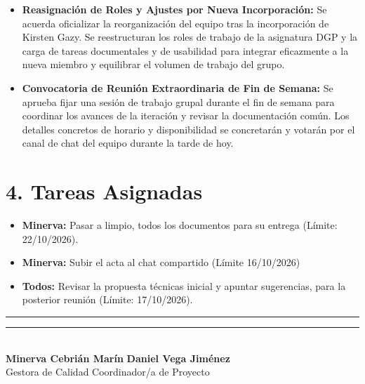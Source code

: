 \begin{itemize}
    \item \textbf{Reasignación de Roles y Ajustes por Nueva Incorporación:} 
    Se acuerda oficializar la reorganización del equipo tras la incorporación de Kirsten Gazy. Se reestructuran los roles de trabajo de la asignatura DGP y la carga de tareas documentales y de usabilidad para integrar eficazmente a la nueva miembro y equilibrar el volumen de trabajo del grupo.
    \item \textbf{Convocatoria de Reunión Extraordinaria de Fin de Semana:} 
    Se aprueba fijar una sesión de trabajo grupal durante el fin de semana para coordinar los avances de la iteración y revisar la documentación común. Los detalles concretos de horario y disponibilidad se concretarán y votarán por el canal de chat del equipo durante la tarde de hoy.
\end{itemize}


\section*{4. Tareas Asignadas}
\begin{itemize}
    \item \textbf{Minerva:} Pasar a limpio, todos los documentos para su entrega (Límite: 22/10/2026).
    \item \textbf{Minerva:} Subir el acta al chat compartido (Límite 16/10/2026)
     \item \textbf{Todos:} Revisar la propuesta técnicas inicial y apuntar sugerencias, para la posterior reunión (Límite: 17/10/2026).
\end{itemize}

\noindent
\rule{6cm}{0.4pt} \hfill \rule{6cm}{0.4pt}\\
\textbf{Minerva Cebrián Marín} \hfill \textbf{Daniel Vega Jiménez}\\
Gestora de Calidad \hfill Coordinador/a de Proyecto

